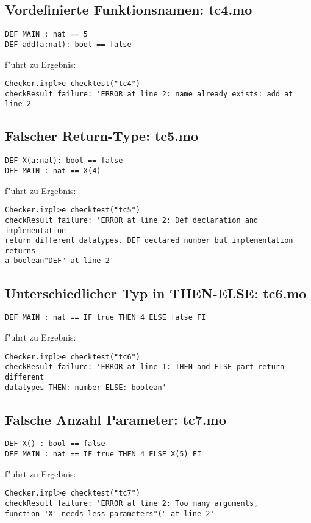 \documentclass[a4paper,12pt]{report}
\begin{document}
\subsection{Vordefinierte Funktionsnamen: tc4.mo}
\begin{verbatim}
DEF MAIN : nat == 5
DEF add(a:nat): bool == false
\end{verbatim}
f"uhrt zu Ergebnis:
\begin{verbatim}
Checker.impl>e checktest("tc4")
checkResult failure: 'ERROR at line 2: name already exists: add at line 2
\end{verbatim}

\subsection{Falscher Return-Type: tc5.mo}
\begin{verbatim}
DEF X(a:nat): bool == false
DEF MAIN : nat == X(4)
\end{verbatim}
f"uhrt zu Ergebnis:
\begin{verbatim}
Checker.impl>e checktest("tc5")
checkResult failure: 'ERROR at line 2: Def declaration and implementation 
return different datatypes. DEF declared number but implementation returns 
a boolean"DEF" at line 2'
\end{verbatim}

\subsection{Unterschiedlicher Typ in THEN-ELSE: tc6.mo}
\begin{verbatim}
DEF MAIN : nat == IF true THEN 4 ELSE false FI
\end{verbatim}
f"uhrt zu Ergebnis:
\begin{verbatim}
Checker.impl>e checktest("tc6")
checkResult failure: 'ERROR at line 1: THEN and ELSE part return different 
datatypes THEN: number ELSE: boolean'
\end{verbatim}

\subsection{Falsche Anzahl Parameter: tc7.mo}
\begin{verbatim}
DEF X() : bool == false
DEF MAIN : nat == IF true THEN 4 ELSE X(5) FI
\end{verbatim}
f"uhrt zu Ergebnis:
\begin{verbatim}
Checker.impl>e checktest("tc7")
checkResult failure: 'ERROR at line 2: Too many arguments, 
function 'X' needs less parameters"(" at line 2'
\end{verbatim}
\end{document}
